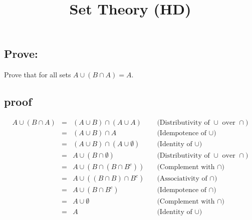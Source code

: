 \documentclass{article}
\title{Set Theory (HD)}
\author{}
\date{}
\begin{document}
	\begin{spacing}{1.5}
		\maketitle
		
		\section*{Prove:}
		Prove that for all sets $A \cup (B \cap A) = A$.
		
		\subsection*{proof}
		\[\begin{array}{rclr}
			A \cup (B \cap A) &=& (A \cup B) \cap (A \cup A) &\quad\text{(Distributivity of $\cup$ over $\cap$)}\\
			&=& (A \cup  B) \cap  A &\quad\text{(Idempotence of $\cup$)}\\
			&=& (A \cup  B) \cap  (A \cup  \emptyset ) &\quad\text{(Identity of $\cup$)}\\
			&=& A \cup  (B \cap  \emptyset ) &\quad\text{(Distributivity of $\cup$ over $\cap$)}\\
			&=& A \cup  (B \cap  (B \cap  B^{c} )) &\quad\text{(Complement with $\cap$)}\\
			&=& A \cup  ((B \cap  B) \cap  B^{c} ) &\quad\text{(Associativity of $\cap$)}\\
			&=& A \cup  (B \cap  B^{c} ) &\quad\text{(Idempotence of $\cap$)}\\
			&=& A \cup  \emptyset  &\quad\text{(Complement with $\cap$)}\\
			&=& A &\quad\text{(Identity of $\cup$)}
		\end{array}\]
		
		
	\end{spacing}
	
	
	
\end{document}
